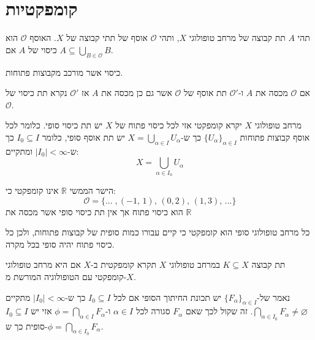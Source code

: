 \documentclass{tstextbook}
\begin{document}
\section{קומפקטיות}

\begin{definition}[כיסוי]
תהי \(A\) תת קבוצה של מרחב טופולוגי \(X\), ותהי \(\mathcal{O}\) אוסף של תתי קבוצה של \(X\). האוסף \(\mathcal{O}\) הוא כיסוי של \(A\) אם \(A\subseteq \bigcup_{ B \in \mathcal{O}}B\).

\end{definition}
\begin{definition}
כיסוי אשר מורכב מקבוצות פתוחות.

\end{definition}
\begin{definition}[תת כיסוי]
אם \(\mathcal{O}\) מכסה את \(A\) ו-\(\mathcal{O}'\) תת אוסף של \(\mathcal{O}\) אשר גם כן מכסה את \(A\) אז \(\mathcal{O'}\) נקרא תת כיסוי של \(\mathcal{O}\).

\end{definition}
\begin{definition}
מרחב טופולוגי \(X\) יקרא קומפקטי אזי לכל כיסוי פתוח של \(X\) יש תת כיסוי סופי.
כלומר לכל אוסף קבוצות פתוחות \(\{ U_{\alpha} \}_{\alpha \in I}\) כך ש-\(X=\bigcup_{\alpha \in I}U_{\alpha}\) יש תת אוסף סופי, כלומר \(I_{0} \subseteq I\) כך ש-\(\lvert I_{0} \rvert<\infty\) ומתקיים:
$$X=\bigcup_{\alpha \in I_{0}}U_{\alpha}$$

\end{definition}
\begin{example}
הישר הממשי \(\mathbb{R}\) אינו קומפקטי כי:
$$\mathcal{O}=\{...\;,(-1,\,1),\,(0,2),\,(1,3),\,...\}$$
הוא כיסוי פתוח אך אין תת כיסוי סופי אשר מכסה את \(\mathbb{R}\)

\end{example}
\begin{example}
כל מרחב טופולוגי סופי הוא קומפקטי כי קיים עבורו כמות סופית של קבוצות פתוחות, ולכן כל כיסוי פתוח יהיה סופי בכל מקרה.

\end{example}
\begin{definition}
תת קבוצה \(K\subseteq X\) במרחב טופולוגי \(X\) תקרא קומפקטית ב-\(X\) אם היא מרחב טופולוגי קומפקטי עם הטופולוגיה המורשת מ-\(X\).

\end{definition}
\begin{definition}
נאמר של-\(\{ F_{\alpha} \}_{\alpha \in I}\) יש תכונת החיתוך הסופי אם לכל \(I_{0} \subseteq I\) כך ש-\(\lvert I_{0} \rvert<\infty\) מתקיים \(\bigcap_{\alpha \in I_{0}}F_{\alpha }\neq \varnothing\).
זה שקול לכך שאם \(F_{\alpha}\) סגורה לכל \(\alpha \in I\) ו-\(\phi = \bigcap_{\alpha \in I} F_{\alpha}\) אזי יש \(I_{0}\subseteq I\) סופית כך ש-\(\phi=\bigcap_{\alpha \in I_{0}}F_{\alpha}\).

\end{definition}
\end{document}
